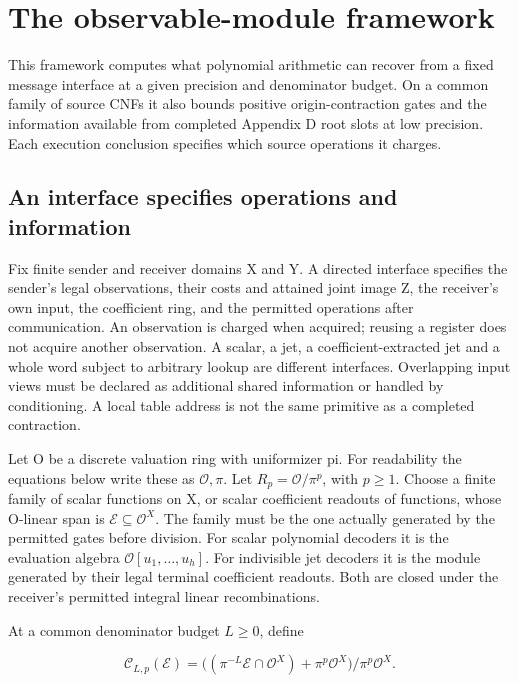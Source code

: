 \documentclass[11pt,a4paper]{article}
\begin{document}
\section{The observable-module framework}\label{v8-section-framework}

This framework computes what polynomial arithmetic can recover from a
fixed message interface at a given precision and denominator budget. On
a common family of source CNFs it also bounds positive
origin-contraction gates and the information available from completed
Appendix D root slots at low precision. Each execution conclusion
specifies which source operations it charges.

\subsection{An interface specifies operations and
information}\label{v8-an-interface-specifies-operations-and-information}

Fix finite sender and receiver domains X and Y. A directed interface
specifies the sender's legal observations, their costs and attained
joint image Z, the receiver's own input, the coefficient ring, and the
permitted operations after communication. An observation is charged when
acquired; reusing a register does not acquire another observation. A
scalar, a jet, a coefficient-extracted jet and a whole word subject to
arbitrary lookup are different interfaces. Overlapping input views must
be declared as additional shared information or handled by conditioning.
A local table address is not the same primitive as a completed
contraction.

Let O be a discrete valuation ring with uniformizer pi. For readability
the equations below write these as \(\mathcal O,\pi\). Let
\(R_p=\mathcal O/\pi^p\), with \(p\ge1\). Choose a finite family of
scalar functions on X, or scalar coefficient readouts of functions,
whose O-linear span is \(\mathcal E\subseteq\mathcal O^X\). The family
must be the one actually generated by the permitted gates before
division. For scalar polynomial decoders it is the evaluation algebra
\(\mathcal O[u_1,\ldots,u_h]\). For indivisible jet decoders it is the
module generated by their legal terminal coefficient readouts. Both are
closed under the receiver's permitted integral linear recombinations.

At a common denominator budget \(L\ge0\), define

\[
 \mathcal C_{L,p}(\mathcal E)=
 \big((\pi^{-L}\mathcal E\cap\mathcal O^X)+\pi^p\mathcal O^X\big)
                /\pi^p\mathcal O^X. \tag{U1}
\]
\end{document}
